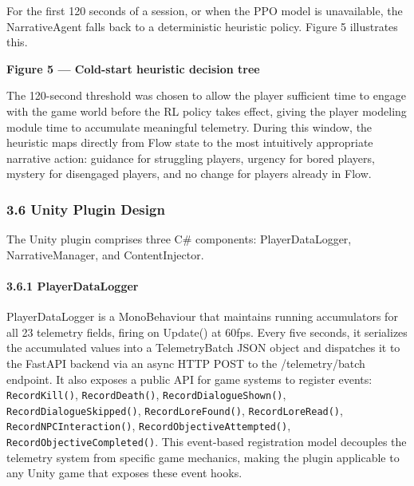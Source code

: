 For the first 120 seconds of a session, or when the PPO model is
unavailable, the NarrativeAgent falls back to a deterministic heuristic
policy. Figure 5 illustrates this.

\begin{Shaded}
\begin{Highlighting}[]
\end{Highlighting}
\end{Shaded}

\textbf{Figure 5 --- Cold-start heuristic decision tree}

The 120-second threshold was chosen to allow the player sufficient time
to engage with the game world before the RL policy takes effect, giving
the player modeling module time to accumulate meaningful telemetry.
During this window, the heuristic maps directly from Flow state to the
most intuitively appropriate narrative action: guidance for struggling
players, urgency for bored players, mystery for disengaged players, and
no change for players already in Flow.

\subsubsection{3.6 Unity Plugin Design}\label{unity-plugin-design}

The Unity plugin comprises three C\# components: PlayerDataLogger,
NarrativeManager, and ContentInjector.

\paragraph{3.6.1 PlayerDataLogger}\label{playerdatalogger}

PlayerDataLogger is a MonoBehaviour that maintains running accumulators
for all 23 telemetry fields, firing on Update() at 60fps. Every five
seconds, it serializes the accumulated values into a TelemetryBatch JSON
object and dispatches it to the FastAPI backend via an async HTTP POST
to the /telemetry/batch endpoint. It also exposes a public API for game
systems to register events: \texttt{RecordKill()},
\texttt{RecordDeath()}, \texttt{RecordDialogueShown()},
\texttt{RecordDialogueSkipped()}, \texttt{RecordLoreFound()},
\texttt{RecordLoreRead()}, \texttt{RecordNPCInteraction()},
\texttt{RecordObjectiveAttempted()},
\texttt{RecordObjectiveCompleted()}. This event-based registration model
decouples the telemetry system from specific game mechanics, making the
plugin applicable to any Unity game that exposes these event hooks.

